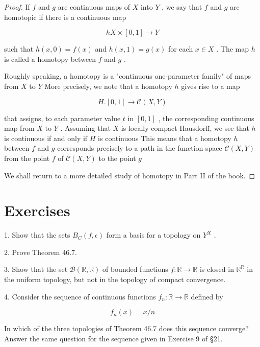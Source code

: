 \begin{proof}
If \(f\) and \(g\) are continuous maps of \(X\) into \(Y\) , we say that \(f\) and \(g\) are homotopic if there is a continuous map

\[
{hX} \times  \left\lbrack  {0,1}\right\rbrack   \rightarrow  Y
\]

such that \(h\left( {x,0}\right)  = f\left( x\right)\) and \(h\left( {x,1}\right)  = g\left( x\right)\) for each \(x \in  X\) . The map \(h\) is called a homotopy between \(f\) and \(g\) .

Roughly speaking, a homotopy is a "continuous one-parameter family" of maps from \(X\) to \(Y\) More precisely, we note that a homotopy \(h\) gives rise to a map

\[
H.\left\lbrack  {0,1}\right\rbrack   \rightarrow  \mathcal{C}\left( {X,Y}\right)
\]

that assigns, to each parameter value \(t\) in \(\left\lbrack  {0,1}\right\rbrack\) , the corresponding continuous map from \(X\) to \(Y\) . Assuming that \(X\) is locally compact Hausdorff, we see that \(h\) is continuous if and only if \(H\) is continuous This means that a homotopy \(h\) between \(f\) and \(g\) corresponds precisely to a path in the function space \(\mathcal{C}\left( {X,Y}\right)\) from the point \(f\) of \(\mathcal{C}\left( {X,Y}\right)\) to the point \(g\)

We shall return to a more detailed study of homotopy in Part II of the book.
\end{proof}
\section*{Exercises}

1. Show that the sets \({B}_{C}\left( {f,\epsilon }\right)\) form a basis for a topology on \({Y}^{X}\) .

2. Prove Theorem 46.7.

3. Show that the set \(\mathcal{B}\left( {\mathbb{R},\mathbb{R}}\right)\) of bounded functions \(f : \mathbb{R} \rightarrow  \mathbb{R}\) is closed in \({\mathbb{R}}^{\mathbb{R}}\) in the uniform topology, but not in the topology of compact convergence.

4. Consider the sequence of continuous functions \({f}_{n} : \mathbb{R} \rightarrow  \mathbb{R}\) defined by

\[
{f}_{n}\left( x\right)  = x/n
\]

In which of the three topologies of Theorem 46.7 does this sequence converge? Answer the same question for the sequence given in Exercise 9 of §21.

